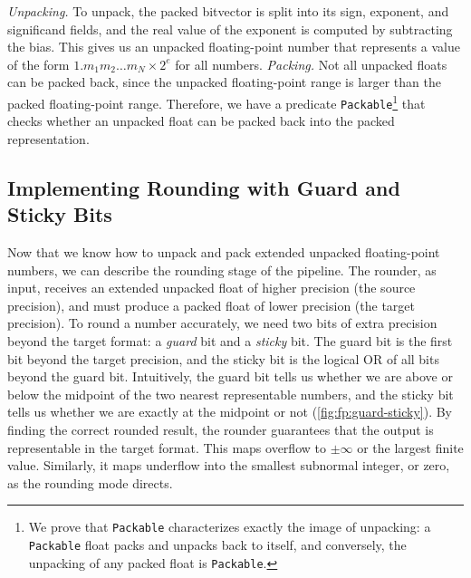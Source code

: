 \emph{Unpacking.} To unpack, the packed bitvector is split into its sign, exponent, and significand fields,
and the real value of the exponent is computed by subtracting the bias.
This gives us an unpacked floating-point number that represents a value of the form $1.m_1 m_2 \dots m_N \times 2^{e}$ for all numbers.
\emph{Packing.} Not all unpacked floats can be packed back, since the unpacked floating-point range is larger than the packed floating-point range.
Therefore, we have a predicate \texttt{Packable}\footnote{We prove that \texttt{Packable} characterizes exactly the image of unpacking: a \texttt{Packable} float packs and unpacks back to itself, and conversely, the unpacking of any packed float is \texttt{Packable}.} that checks whether an unpacked float can be packed back into the packed representation.


\subsection{Implementing Rounding with Guard and Sticky Bits}\label{sec:fp:rounding}

Now that we know how to unpack and pack extended unpacked floating-point numbers, we can describe the rounding stage of the pipeline.
The rounder, as input, receives an extended unpacked float of higher precision (the source precision), and must produce a packed float of lower precision (the target precision).
To round a number accurately, we need two bits of extra precision beyond the target format: a \emph{guard} bit and a \emph{sticky} bit.
The guard bit is the first bit beyond the target precision, and the sticky bit is the logical OR of all bits beyond the guard bit.
Intuitively, the guard bit tells us whether we are above or below the midpoint of the two nearest representable numbers,
and the sticky bit tells us whether we are exactly at the midpoint or not (\cref{fig:fp:guard-sticky}).
By finding the correct rounded result, the rounder guarantees that the output is representable in the target format.
This maps overflow to $\pm\infty$ or the largest finite value.
Similarly, it maps underflow into the smallest subnormal integer, or zero, as the rounding mode directs.



